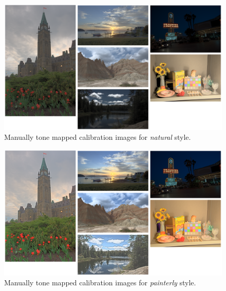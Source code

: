 \begin{figure}
\begin{center}
\includegraphics[width=\textwidth]{appendix2/calibimg_natural.pdf}
\caption{Manually tone mapped calibration images for \emph{natural} style.}
\end{center}
\end{figure}

\begin{figure}
\begin{center}
\includegraphics[width=\textwidth]{appendix2/calibimg_painterly.pdf}
\caption{Manually tone mapped calibration images for \emph{painterly} style.}
\end{center}
\end{figure}